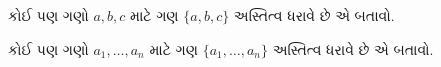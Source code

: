 \documentclass[../../../include/open-logic-section]{subfiles}
\begin{document}
\begin{prob}
કોઈ પણ ગણો $a, b, c$ માટે ગણ $\{a, b, c\}$ અસ્તિત્વ ધરાવે છે
એ બતાવો.
\end{prob}

\begin{prob}
કોઈ પણ ગણો $a_1, \ldots, a_n$ માટે ગણ $\{a_1, \ldots,
a_n\}$ અસ્તિત્વ ધરાવે છે એ બતાવો.
\end{prob}

\end{document}

